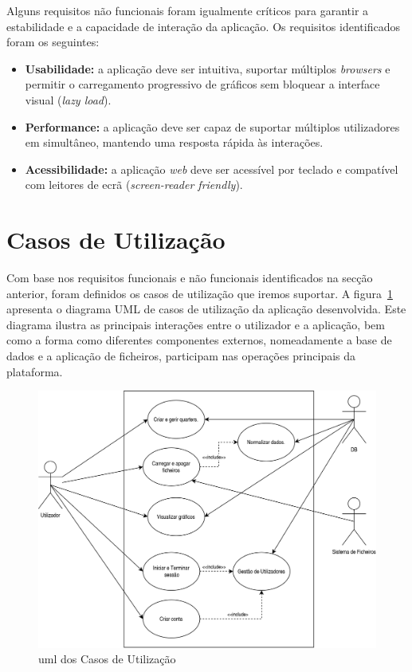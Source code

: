 Alguns requisitos não funcionais foram igualmente críticos para garantir a estabilidade e a capacidade de interação da aplicação. Os requisitos identificados foram os seguintes:

\begin{itemize}
    \item \textbf{Usabilidade:} a aplicação deve ser intuitiva, suportar múltiplos \textit{browsers} e permitir o carregamento progressivo de gráficos sem bloquear a interface visual (\textit{lazy load}).
    
    \item \textbf{Performance:} a aplicação deve ser capaz de suportar múltiplos utilizadores em simultâneo, mantendo uma resposta rápida às interações.
    
    \item \textbf{Acessibilidade:} a aplicação \textit{web} deve ser acessível por teclado e compatível com leitores de ecrã (\textit{screen-reader friendly}).

\end{itemize}

\section{Casos de Utilização}
\label{ch:casosUtilizacao}

Com base nos requisitos funcionais e não funcionais identificados na secção anterior, foram definidos os casos de utilização que iremos suportar. A figura~\ref{fig:umlCasosUtilizacao} apresenta o diagrama UML de casos de utilização da aplicação desenvolvida. Este diagrama ilustra as principais interações entre o utilizador e a aplicação, bem como a forma como diferentes componentes externos, nomeadamente a base de dados e a aplicação de ficheiros, participam nas operações principais da plataforma.

\begin{figure}[h]
\centering
\includegraphics[max width=\textwidth]{./img/usecase_uml}
\caption{\gls{uml} dos Casos de Utilização}
\label{fig:umlCasosUtilizacao}
\end{figure}

